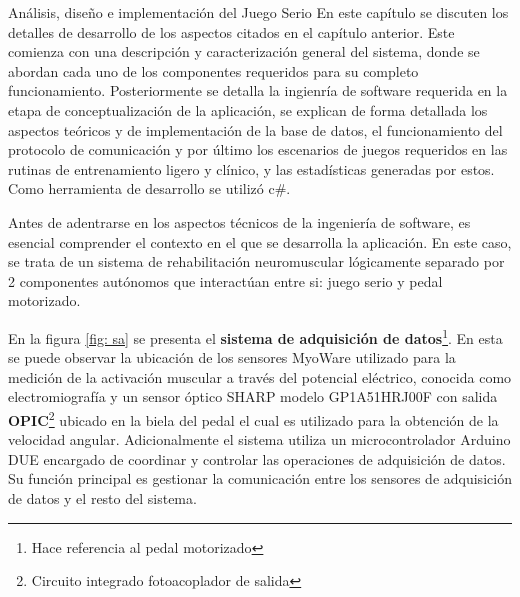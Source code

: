 \begin{thesischapter}{2} {Análisis, diseño e implementación del Juego Serio}
    En este capítulo se discuten los detalles de desarrollo de los aspectos citados en el capítulo anterior. Este comienza con una descripción y caracterización general del sistema, donde se  abordan cada uno de los componentes requeridos para su completo funcionamiento. Posteriormente se detalla la ingienría de software requerida en la etapa de conceptualización de la aplicación, se explican de forma 
    detallada los aspectos teóricos y de implementación de la base de datos, el funcionamiento del protocolo de comunicación y por último los escenarios de juegos requeridos en las rutinas de entrenamiento ligero y clínico, y las estadísticas generadas por estos. Como herramienta de desarrollo se utilizó c\#.

    Antes de adentrarse en los aspectos técnicos de la ingeniería de software, es esencial comprender el contexto en 
    el que se desarrolla la aplicación. En este caso, se trata de un sistema de rehabilitación neuromuscular lógicamente 
    separado por 2 componentes autónomos que interactúan entre si: juego serio y pedal motorizado. 

    \vspace{10pt} %
    En la figura \ref{fig: sa} se presenta el \textbf{sistema de adquisición de datos}\footnote{Hace referencia al pedal motorizado}. En esta se puede observar la ubicación de los sensores MyoWare  utilizado para la medición de la activación muscular a través del potencial eléctrico, conocida como electromiografía y un sensor óptico SHARP modelo GP1A51HRJ00F con salida  \textbf{OPIC}\footnote{Circuito integrado fotoacoplador de salida} ubicado en la biela del pedal el cual es utilizado para la obtención de la velocidad angular. Adicionalmente el sistema utiliza un microcontrolador Arduino DUE encargado de coordinar y controlar las operaciones de adquisición de datos. Su función principal es gestionar la comunicación entre los sensores de adquisición de datos y el resto del sistema.


\end{thesischapter}
